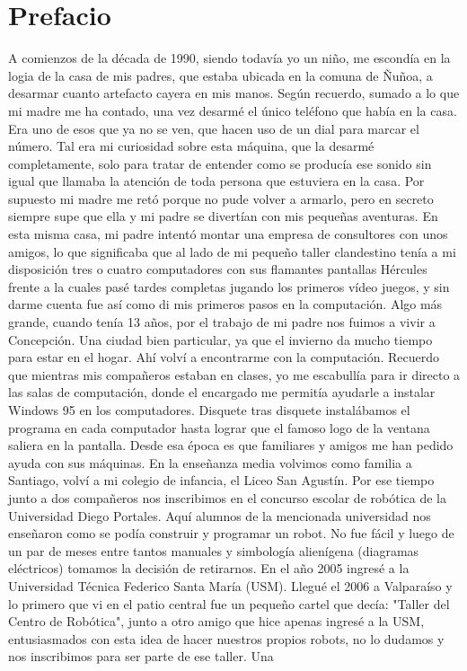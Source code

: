 
\chapter*{Prefacio} %

\label{Prefacio} %


A comienzos de la década de 1990, siendo todavía yo un niño, me escondía en la logia de la casa de mis padres, que estaba ubicada en la comuna de Ñuñoa, a desarmar cuanto artefacto cayera en mis manos. Según recuerdo, sumado a lo que mi madre me ha contado, una vez desarmé el único teléfono que había en la casa. Era uno de esos que ya no se ven, que hacen uso de un dial para marcar el número. Tal era mi curiosidad sobre esta máquina, que la desarmé completamente, solo para tratar de entender como se producía ese sonido sin igual que llamaba la atención de toda persona que estuviera en la casa. Por supuesto mi madre me retó porque no pude volver a armarlo, pero en secreto siempre supe que ella y mi padre se divertían con mis pequeñas aventuras. En esta misma casa, mi padre intentó montar una empresa de consultores con unos amigos, lo que significaba que al lado de mi pequeño taller clandestino tenía a mi disposición tres o cuatro computadores con sus flamantes pantallas Hércules frente a la cuales pasé tardes completas jugando los primeros vídeo juegos, y sin darme cuenta fue así como di mis primeros pasos en la computación. Algo más grande, cuando tenía 13 años, por el trabajo de mi padre nos fuimos a vivir a Concepción. Una ciudad bien particular, ya que el invierno da mucho tiempo para estar en el hogar. Ahí volví a encontrarme con la computación. Recuerdo que mientras mis compañeros estaban en clases, yo me escabullía para ir directo a las salas de computación, donde el encargado me permitía ayudarle a instalar Windows 95 en los computadores. Disquete tras disquete instalábamos el programa en cada computador hasta lograr que el famoso logo de la ventana saliera en la pantalla. Desde esa  época es que familiares y amigos me han pedido ayuda con sus máquinas. En la enseñanza media volvimos como familia a Santiago, volví a mi colegio de infancia, el Liceo San Agustín. Por ese tiempo junto a dos compañeros nos inscribimos en el concurso escolar de robótica de la Universidad Diego Portales. Aquí alumnos de la mencionada universidad nos enseñaron como se podía construir y programar un robot. No fue fácil y luego de un par de meses entre tantos manuales y simbología alienígena (diagramas eléctricos) tomamos la decisión de retirarnos. En el año 2005 ingresé a la Universidad Técnica Federico Santa María (USM). Llegué el 2006 a Valparaíso y lo primero que vi en el patio central fue un pequeño cartel que decía: "Taller del Centro de Robótica", junto a otro amigo que hice apenas ingresé a la USM, entusiasmados con esta idea de hacer nuestros propios robots, no lo dudamos y nos inscribimos para ser parte de ese taller. Una 